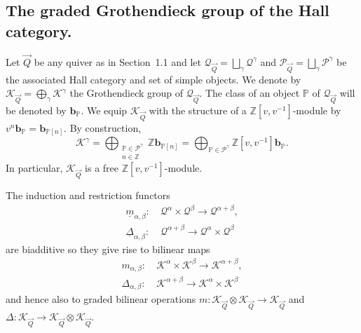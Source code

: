 \documentclass[a4paper,10pt]{amsart}
\def\Z{\mathbb{Z}}
\def\a{\alpha}
\def\QQ{\mathcal{Q}_{\vec{Q}}}
\numberwithin{equation}{section}
\begin{document}
\vspace{.3in}

\subsection{The graded Grothendieck group of the Hall category.}


\vspace{.15in}

Let $\vec{Q}$ be any quiver as in Section~1.1 and let $\QQ=\bigsqcup_{\gamma} \mathcal{Q}^{\gamma}$ and $\mathcal{P}_{\vec{Q}}=\bigsqcup_{\gamma} \mathcal{P}^{\gamma}$ be the associated Hall category and set of simple objects. We denote by $\mathcal{K}_{\vec{Q}}=\bigoplus_{\gamma} \mathcal{K}^{\gamma}$ the Grothendieck group of $\QQ$. The class of an object $\mathbb{P}$ of $\QQ$ will be denoted by $\mathbf{b}_{\mathbb{P}}$. We equip $\mathcal{K}_{\vec{Q}}$ with the structure of a $\Z[v,v^{-1}]$-module by $v^n \mathbf{b}_{\mathbb{P}}=\mathbf{b}_{\mathbb{P}[n]}$. By construction, 
$$\mathcal{K}^{\gamma}=\bigoplus_{\substack{\mathbb{P} \in \mathcal{P}^{\gamma}\\ n \in \Z}} \Z \mathbf{b}_{\mathbb{P}[n]}=\bigoplus_{\mathbb{P} \in \mathcal{P}^{\gamma}} \Z[v,v^{-1}] \mathbf{b}_{\mathbb{P}}.$$
In particular, $\mathcal{K}_{\vec{Q}}$ is a free $\Z[v,v^{-1}]$-module. 

\vspace{.1in}

The induction and restriction functors
\begin{align*}
\underline{m}_{\a,\beta}:~& \mathcal{Q}^{\a} \times \mathcal{Q}^{\beta} \to \mathcal{Q}^{\a+\beta},\\
\underline{\Delta}_{\a,\beta}:~& \mathcal{Q}^{\a+\beta} \to \mathcal{Q}^{\a} \times \mathcal{Q}^{\beta}
\end{align*}
are biadditive so they give rise to bilinear maps
\begin{align*}
{m}_{\a,\beta}:~& \mathcal{K}^{\a} \times \mathcal{K}^{\beta} \to \mathcal{K}^{\a+\beta},\\
{\Delta}_{\a,\beta}:~& \mathcal{K}^{\a+\beta} \to \mathcal{K}^{\a} \times \mathcal{K}^{\beta}
\end{align*}
and hence also to graded bilinear operations $m: \mathcal{K}_{\vec{Q}} \otimes \mathcal{K}_{\vec{Q}} \to \mathcal{K}_{\vec{Q}}$ and $\Delta: \mathcal{K}_{\vec{Q}} \to \mathcal{K}_{\vec{Q}} \otimes \mathcal{K}_{\vec{Q}}$.
\end{document}
